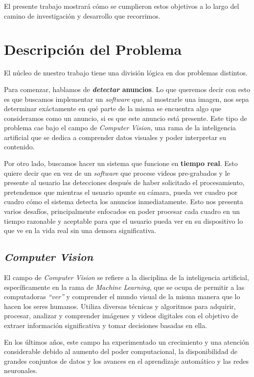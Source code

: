 \documentclass[a4paper]{article}
\begin{document}
El presente trabajo mostrará cómo se cumplieron estos objetivos a lo largo del camino de investigación y desarrollo que recorrimos.

\section{Descripción del Problema}

El núcleo de nuestro trabajo tiene una división lógica en dos problemas distintos.

Para comenzar, hablamos de \textbf{\textit{detectar} anuncios}. Lo que queremos decir con esto es que buscamos implementar un \textit{software} que, al mostrarle una imagen, nos sepa determinar exáctamente en qué parte de la misma se encuentra algo que consideramos como un anuncio, si es que este anuncio está presente.
Este tipo de problema cae bajo el campo de \textit{Computer Vision}, una rama de la inteligencia artificial que se dedica a comprender datos visuales y poder interpretar su contenido.

Por otro lado, buscamos hacer un sistema que funcione en \textbf{tiempo real}. Esto quiere decir que en vez de un \textit{software} que procese videos pre-grabados y le presente al usuario las detecciones después de haber solicitado el procesamiento, pretendemos que mientras el usuario apunte su cámara, pueda ver cuadro por cuadro cómo el sistema detecta los anuncios inmediatamente.
Esto nos presenta varios desafíos, principalmente enfocados en poder procesar cada cuadro en un tiempo razonable y aceptable para que el usuario pueda ver en su dispositivo lo que ve en la vida real sin una demora significativa.

\subsection{\textit{Computer Vision}}

El campo de \textit{Computer Vision} se refiere a la disciplina de la inteligencia artificial, específicamente en la rama de \textit{Machine Learning}, que se ocupa de permitir a las computadoras \textit{``ver''} y comprender el mundo visual de la misma manera que lo hacen los seres humanos. Utiliza diversas técnicas y algoritmos para adquirir, procesar, analizar y comprender imágenes y videos digitales con el objetivo de extraer información significativa y tomar decisiones basadas en ella.

En los últimos años, este campo ha experimentado un crecimiento y una atención considerable debido al aumento del poder computacional, la disponibilidad de grandes conjuntos de datos y los avances en el aprendizaje automático y las redes neuronales.
\end{document}
